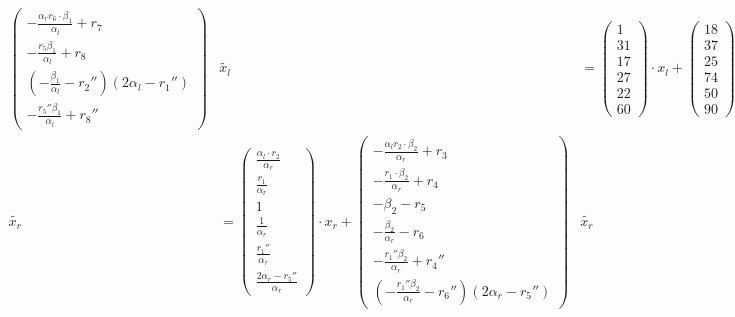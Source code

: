 \begin{align*}
\begin{pmatrix}
  -\frac{\alpha_r r_6 \cdot \beta_1}{\alpha_l} + r_7\\
  -\frac{r_5\beta_1}{\alpha_l} + r_8\\
  (-\frac{\beta_1}{\alpha_l}-r_2'')(2\alpha_l-r_1'')\\
  -\frac{r_5''\beta_1}{\alpha_l} + r_8''
\end{pmatrix}
&
\widetilde{x_l} & =
\begin{pmatrix}1\\31\\17\\27\\22\\60\end{pmatrix}
\cdot x_l +
\begin{pmatrix}18\\37\\25\\74\\50\\90\end{pmatrix}\\
%
\widetilde{x_r} & =
\begin{pmatrix}
  \frac{\alpha_l \cdot r_2}{\alpha_r}\\
  \frac{r_1}{\alpha_r}\\
  1\\
  \frac{1}{\alpha_r}\\
  \frac{r_1''}{\alpha_r}\\
  \frac{2\alpha_r-r_5''}{\alpha_r}
\end{pmatrix}
\cdot x_r +
\begin{pmatrix}
  -\frac{\alpha_lr_2 \cdot \beta_2}{\alpha_r} + r_3\\
  -\frac{r_1 \cdot \beta_2}{\alpha_r} + r_4\\
  -\beta_2-r_5\\
  -\frac{\beta_2}{\alpha_r}-r_6\\
  -\frac{r_1''\beta_2}{\alpha_r} + r_4''\\
  \left(-\frac{r_1''\beta_2}{\alpha_r} -r_6''\right)(2\alpha_r - r_5'')
\end{pmatrix}
&
\widetilde{x_r} & =
\begin{pmatrix}3\\79\\1\\10\\53\\64\end{pmatrix}
\cdot x_r +
\begin{pmatrix}66\\91\\15\\75\\19\\78\end{pmatrix}\\

\end{align*}
